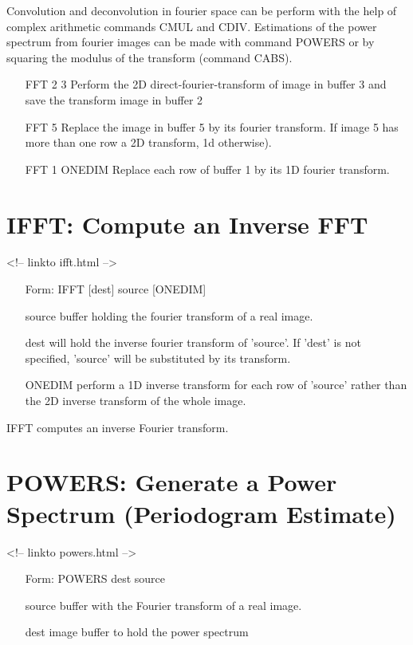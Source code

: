 Convolution and deconvolution in fourier space can be perform with the help
of complex arithmetic commands CMUL and CDIV. Estimations of the power
spectrum from fourier images can be made with command POWERS or by
squaring the modulus of the transform (command CABS).

\begin{itemize}
  \item[FFT 2 3\hfill]{Perform the 2D direct-fourier-transform of 
       image in buffer 3 and save the transform image in buffer 2}
  \item[FFT 5\hfill]{Replace the image in buffer 5 by its fourier transform. 
       If image 5 has more than one row a 2D transform, 1d otherwise).}
  \item[FFT 1 ONEDIM\hfill]{Replace each row of buffer 1 by its 1D fourier 
       transform.}
\end{itemize}

\section{IFFT: Compute an Inverse FFT}
\begin{rawhtml}
<!-- linkto ifft.html -->
\end{rawhtml}
\begin{itemize}
  \item[Form: IFFT  {[dest]} source {[ONEDIM]}\hfill]{}
  \item[source]{buffer holding the fourier transform of a real image.}
  \item[dest]{will hold the inverse fourier transform of 'source'. If
       'dest' is not specified, 'source' will be substituted by its
       transform.}
  \item[ONEDIM]{perform a 1D inverse transform for each row of 'source'
       rather than the 2D inverse transform of the whole image.}
\end{itemize}

IFFT computes an inverse Fourier transform.

\section{POWERS: Generate a Power Spectrum (Periodogram Estimate)}
\begin{rawhtml}
<!-- linkto powers.html -->
\end{rawhtml}
\begin{itemize}
  \item[Form: POWERS dest source\hfill]{}
  \item[source]{buffer with the Fourier transform of a real image.}
  \item[dest]{image buffer to hold the power spectrum}
\end{itemize}

